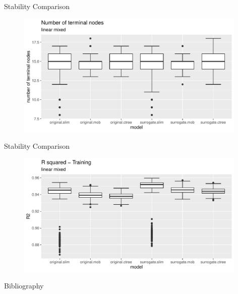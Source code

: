 \documentclass[9pt, xcolor=table]{beamer}
\begin{document}
\begin{frame}{Stability Comparison}
\begin{figure}
    \includegraphics[width=11cm]{Figures/Stability/linear_mixed/nofnodes.pdf}
\end{figure}
\end{frame}

\begin{frame}{Stability Comparison}
\begin{figure}
    \includegraphics[width=11cm]{Figures/Stability/linear_mixed/r2_train.pdf}
\end{figure}
\end{frame}


\begin{frame}{Bibliography}
    
    

\end{frame}
\end{document}
